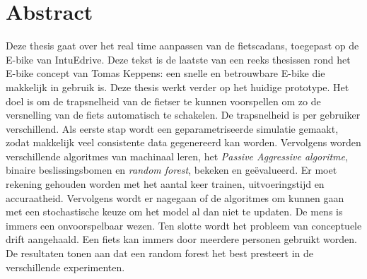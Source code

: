 \documentclass[12pt,a4paper,oneside]{book}
\makeatletter
\renewcommand{\algorithmcfname}{Algoritme}
\newcommand{\RemoveAlgoNumber}{\renewcommand{\fnum@algocf}{\AlCapSty{\AlCapFnt\algorithmcfname}}}
\makeatother
\begin{document}
\chapter{Abstract}
Deze thesis gaat over het real time aanpassen van de fietscadans, toegepast op de E-bike van IntuEdrive. Deze tekst is de laatste van een reeks thesissen rond het E-bike concept van Tomas Keppens: een snelle en betrouwbare E-bike die makkelijk in gebruik is. Deze thesis werkt verder op het huidige prototype. Het doel is om de trapsnelheid van de fietser te kunnen voorspellen om zo de versnelling van de fiets automatisch te schakelen. De trapsnelheid is per gebruiker verschillend. Als eerste stap wordt een geparametriseerde simulatie gemaakt, zodat makkelijk veel consistente data gegenereerd kan worden. Vervolgens worden verschillende algoritmes van machinaal leren, het \textit{Passive Aggressive algoritme}, binaire beslissingsbomen en \textit{random forest}, bekeken en geëvalueerd. Er moet rekening gehouden worden met het aantal keer trainen, uitvoeringstijd en accuraatheid. Vervolgens wordt er nagegaan of de algoritmes om kunnen gaan met een stochastische keuze om het model al dan niet te updaten. De mens is immers een onvoorspelbaar wezen. Ten slotte wordt het probleem van conceptuele drift aangehaald. Een fiets kan immers door meerdere personen gebruikt worden. De resultaten tonen aan dat een random forest het best presteert in de verschillende experimenten.
\tableofcontents
\newpage
\listoffigures
{}
\listoftables
{}
\newpage
\printglossary[type=\acronymtype ,title=Lijst van afkortingen ,style=mystyle]
\newpage
{}
\printglossary[title=Lijst van symbolen,style=mystyle]

\mainmatter
{}
\RemoveAlgoNumber







\end{document}
